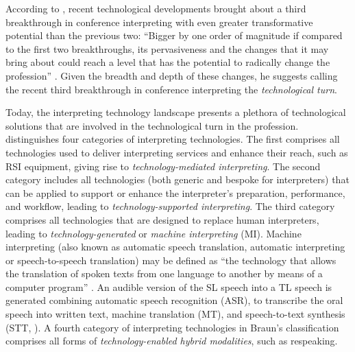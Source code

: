 \begin{sloppypar}
According to \citet{fantinuoli2018a}, recent technological developments brought about a third breakthrough in conference interpreting with even greater transformative potential than the previous two: ``Bigger by one order of magnitude if compared to the first two breakthroughs, its pervasiveness and the changes that it may bring about could reach a level that has the potential to radically change the profession'' \citep[3]{fantinuoli2018a}. Given the breadth and depth of these changes, he suggests calling the recent third breakthrough in conference interpreting the \textit{technological turn}.
\end{sloppypar}

Today, the interpreting technology landscape presents a plethora of technological solutions that are involved in the technological turn in the profession. \citet{braun2019technology} distinguishes four categories of interpreting technologies. The first comprises all technologies used to deliver interpreting services and enhance their reach, such as RSI equipment, giving rise to \textit{technology-mediated interpreting}. The second category includes all technologies (both generic and bespoke for interpreters) that can be applied to support or enhance the interpreter’s preparation, performance, and workflow, leading to \textit{technology-supported interpreting}. The third category comprises all technologies that are designed to replace human interpreters, leading to \textit{technology-generated} or \textit{machine interpreting} (MI). Machine interpreting (also known as automatic speech translation, automatic interpreting or speech-to-speech translation) may be defined as ``the technology that allows the translation of spoken texts from one language to another by means of a computer program'' \citep[5]{fantinuoli2018a}. An audible version of the SL speech into a TL speech is generated combining automatic speech recognition (ASR), to transcribe the oral speech into written text, machine translation (MT), and speech-to-text synthesis (STT, \citealt[5]{fantinuoli2018a}). A fourth category of interpreting technologies in Braun’s classification comprises all forms of \textit{technology-enabled hybrid modalities}, such as respeaking.


